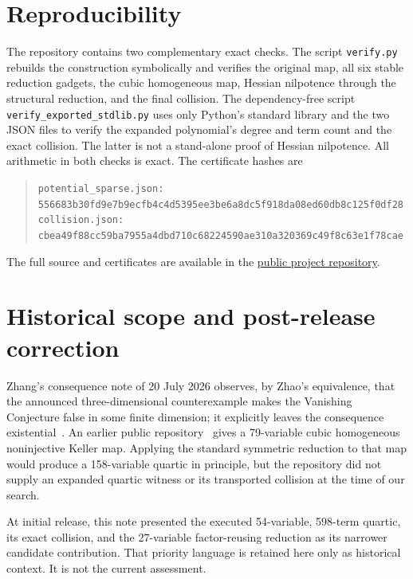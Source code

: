 \documentclass[11pt]{article}
\begin{document}
\section{Reproducibility}

The repository contains two complementary exact checks.  The script
\texttt{verify.py} rebuilds the construction symbolically and verifies the
original map, all six stable reduction gadgets, the cubic homogeneous map,
Hessian nilpotence through the structural reduction, and the final collision.
The dependency-free script \texttt{verify\_exported\_stdlib.py} uses only
Python's standard library and the two JSON files to verify the expanded
polynomial's degree and term count and the exact collision.  The latter is not
a stand-alone proof of Hessian nilpotence.  All arithmetic in both checks is
exact.  The certificate hashes are
\begin{quote}\small
\texttt{potential\_sparse.json:}\\
\nolinkurl{556683b30fd9e7b9ecfb4c4d5395ee3be6a8dc5f918da08ed60db8c125f0df28}\\[3pt]
\texttt{collision.json:}\\
\nolinkurl{cbea49f88cc59ba7955a4dbd710c68224590ae310a320369c49f8c63e1f78cae}
\end{quote}
The full source and certificates are available in the
\href{https://github.com/AlecKriebel/Math/tree/main/discovery_02_explicit_vanishing_counterexample}{public project repository}.

\section{Historical scope and post-release correction}

Zhang's consequence note of 20 July 2026 observes, by Zhao's equivalence, that
the announced three-dimensional counterexample makes the Vanishing Conjecture
false in some finite dimension; it explicitly leaves the consequence
existential~\cite{zhang}.  An earlier public repository~\cite{harrison} gives
a 79-variable cubic homogeneous noninjective Keller map.  Applying the
standard symmetric reduction to that map would produce a 158-variable quartic
in principle, but the repository did not supply an expanded quartic witness
or its transported collision at the time of our search.

At initial release, this note presented the executed 54-variable, 598-term
quartic, its exact collision, and the 27-variable factor-reusing reduction as
its narrower candidate contribution. That priority language is retained here
only as historical context. It is not the current assessment.
\end{document}
